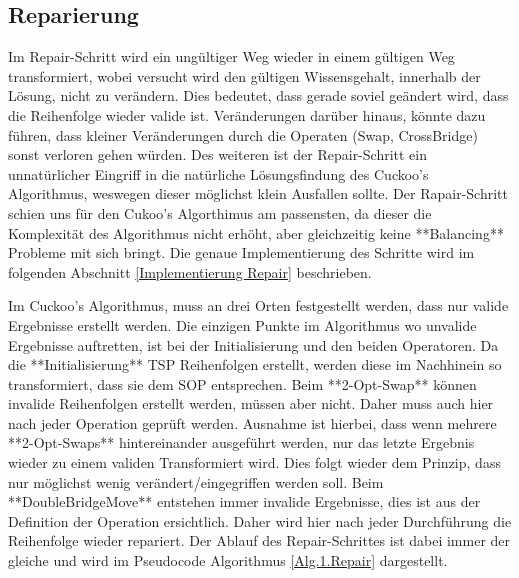\documentclass[conference]{IEEEtran}
\begin{document}
    \subsection{Reparierung}
      Im Repair-Schritt wird ein ungültiger Weg wieder in einem gültigen Weg transformiert, wobei 
      versucht wird den gültigen Wissensgehalt, innerhalb der Lösung, nicht zu verändern. Dies bedeutet, 
      dass gerade soviel geändert wird, dass die Reihenfolge wieder valide ist. Veränderungen darüber hinaus, 
      könnte dazu führen, dass kleiner Veränderungen durch die Operaten (Swap, CrossBridge) sonst verloren gehen würden.
      Des weiteren ist der Repair-Schritt ein unnatürlicher Eingriff in die natürliche Lösungsfindung des Cuckoo's Algorithmus, 
      weswegen dieser möglichst klein Ausfallen sollte.
      Der Rapair-Schritt schien uns für den Cukoo's Algorthimus am passensten, da dieser die Komplexität des Algorithmus nicht erhöht, aber 
      gleichzeitig keine **Balancing** Probleme mit sich bringt. Die genaue Implementierung des Schritte wird im folgenden Abschnitt \ref{Implementierung Repair}
      beschrieben.


      Im Cuckoo's Algorithmus, muss an drei Orten festgestellt werden, dass nur valide Ergebnisse erstellt werden. Die einzigen Punkte im 
      Algorithmus wo unvalide Ergebnisse auftretten, ist bei der Initialisierung und den beiden Operatoren. 
      Da die **Initialisierung** TSP Reihenfolgen erstellt, werden diese im Nachhinein so transformiert, dass sie dem SOP entsprechen. 
      Beim **2-Opt-Swap** können invalide Reihenfolgen erstellt werden, müssen aber nicht. Daher muss auch hier nach jeder Operation geprüft werden. 
      Ausnahme ist hierbei, dass wenn mehrere **2-Opt-Swaps** hintereinander ausgeführt werden, nur das letzte Ergebnis wieder zu einem validen Transformiert wird. 
      Dies folgt wieder dem Prinzip, dass nur möglichst wenig verändert/eingegriffen werden soll. 
      Beim **DoubleBridgeMove** entstehen immer invalide Ergebnisse, dies ist aus der Definition der Operation ersichtlich. 
      Daher wird hier nach jeder Durchführung die Reihenfolge wieder repariert. 
      Der Ablauf des Repair-Schrittes ist dabei immer der gleiche und wird im Pseudocode Algorithmus \ref{Alg.1.Repair} dargestellt.
\end{document}
